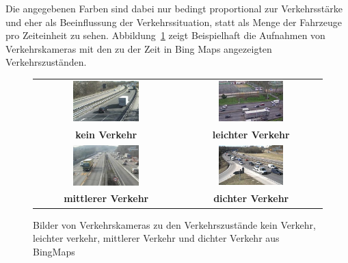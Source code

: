 Die angegebenen Farben sind dabei nur bedingt proportional zur Verkehrsstärke und eher als Beeinflussung der Verkehrssituation, statt als Menge der Fahrzeuge pro Zeiteinheit zu sehen. Abbildung~\ref{fig:uebersicht_verkehrszustaende} zeigt Beispielhaft die Aufnahmen von Verkehrskameras mit den zu der Zeit in Bing Maps angezeigten Verkehrszuständen.\\  
\begin{figure}
\begin{tabular}{@{}cc@{}}
\includegraphics[width = 0.48\textwidth]{images/no_traffic.png} &
\includegraphics[width = 0.48\textwidth]{images/low_traffic.png} \\ 
\textbf{kein Verkehr}  & \textbf{leichter Verkehr}   \\
\includegraphics[width = 0.48\textwidth]{images/medium_traffic.png} & 
\includegraphics[width = 0.48\textwidth]{images/heavy_traffic.png} \\
\textbf{mittlerer Verkehr} & \textbf{dichter Verkehr}\\
\end{tabular}
\caption{Bilder von Verkehrskameras zu den Verkehrszustände kein Verkehr, leichter verkehr, mittlerer Verkehr und dichter Verkehr aus BingMaps}
\label{fig:uebersicht_verkehrszustaende}
\end{figure}

